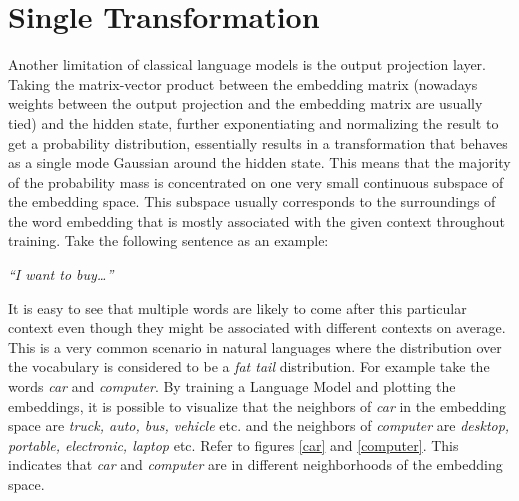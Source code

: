 \section{Single Transformation}

Another limitation of classical language models is the output projection layer. Taking the matrix-vector product between the embedding matrix (nowadays weights between the output projection and the embedding matrix are usually tied) and the hidden state, further exponentiating and normalizing the result to get a probability distribution, essentially results in a transformation that behaves as a single mode Gaussian around the hidden state. This means that the majority of the probability mass is concentrated on one very small continuous subspace of the embedding space. This subspace usually corresponds to the surroundings of the word embedding that is mostly associated with the given context throughout training. Take the following sentence as an example:

\begin{center}
    \emph{“I want to buy…”}
\end{center}

It is easy to see that multiple words are likely to come after this particular context even though they might be associated with different contexts on average. This is a very common scenario in natural languages where the distribution over the vocabulary is considered to be a \emph{fat tail} distribution. For example take the words \emph{car} and \emph{computer}. By training a Language Model and plotting the embeddings, it is possible to visualize that the neighbors of \emph{car} in the embedding space are \emph{truck, auto, bus, vehicle} etc. and the neighbors of \emph{computer} are \emph{desktop, portable, electronic, laptop} etc. Refer to figures \ref{car} and \ref{computer}. This indicates that \emph{car} and \emph{computer} are in different neighborhoods of the embedding space.


